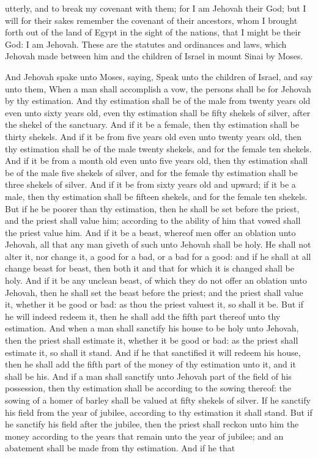 utterly, and to break my covenant with them; for I am Jehovah their God; but I will for their sakes remember the covenant of their ancestors, whom I brought forth out of the land of Egypt in the sight of the nations, that I might be their God: I am Jehovah.  These are the statutes and ordinances and laws, which Jehovah made between him and the children of Israel in mount Sinai by Moses. 

And Jehovah spake unto Moses, saying, Speak unto the children of Israel, and say unto them, When a man shall accomplish a vow, the persons shall be for Jehovah by thy estimation. And thy estimation shall be of the male from twenty years old even unto sixty years old, even thy estimation shall be fifty shekels of silver, after the shekel of the sanctuary. And if it be a female, then thy estimation shall be thirty shekels. And if it be from five years old even unto twenty years old, then thy estimation shall be of the male twenty shekels, and for the female ten shekels. And if it be from a month old even unto five years old, then thy estimation shall be of the male five shekels of silver, and for the female thy estimation shall be three shekels of silver. And if it be from sixty years old and upward; if it be a male, then thy estimation shall be fifteen shekels, and for the female ten shekels. But if he be poorer than thy estimation, then he shall be set before the priest, and the priest shall value him; according to the ability of him that vowed shall the priest value him.  And if it be a beast, whereof men offer an oblation unto Jehovah, all that any man giveth of such unto Jehovah shall be holy. He shall not alter it, nor change it, a good for a bad, or a bad for a good: and if he shall at all change beast for beast, then both it and that for which it is changed shall be holy. And if it be any unclean beast, of which they do not offer an oblation unto Jehovah, then he shall set the beast before the priest; and the priest shall value it, whether it be good or bad: as thou the priest valuest it, so shall it be. But if he will indeed redeem it, then he shall add the fifth part thereof unto thy estimation.  And when a man shall sanctify his house to be holy unto Jehovah, then the priest shall estimate it, whether it be good or bad: as the priest shall estimate it, so shall it stand. And if he that sanctified it will redeem his house, then he shall add the fifth part of the money of thy estimation unto it, and it shall be his.  And if a man shall sanctify unto Jehovah part of the field of his possession, then thy estimation shall be according to the sowing thereof: the sowing of a homer of barley shall be valued at fifty shekels of silver. If he sanctify his field from the year of jubilee, according to thy estimation it shall stand. But if he sanctify his field after the jubilee, then the priest shall reckon unto him the money according to the years that remain unto the year of jubilee; and an abatement shall be made from thy estimation. And if he that 